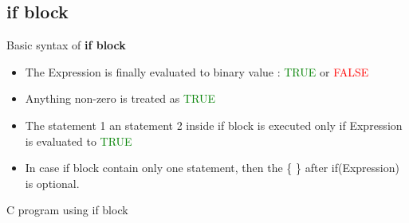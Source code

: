 \documentclass[10pt,a4paper]{beamer}
\begin{document}
    \subsection{if block}
        \begin{frame}{Basic syntax of \textbf{if block}}
                \begin{minipage}{0.3\textwidth}
                    
                \end{minipage}%
                 \begin{minipage}{0.7\textwidth}
                    \begin{itemize}
                        \item The Expression is finally evaluated to binary value : \textcolor{green}{TRUE} or \textcolor{red}{FALSE}
                        \item Anything non-zero is treated as  \textcolor{green}{TRUE}
                    \end{itemize}      
                \end{minipage}
                        
            \begin{itemize}
                \item The statement 1 an statement 2 inside if block is executed only if Expression is evaluated to  \textcolor{green}{TRUE}
                \item In case if block contain only one statement, then the \{ \} after if(Expression) is optional.
            \end{itemize}
        \end{frame}
        
    \begin{frame}{C program using if block}
        
        
    \end{frame}
    
\end{document}
